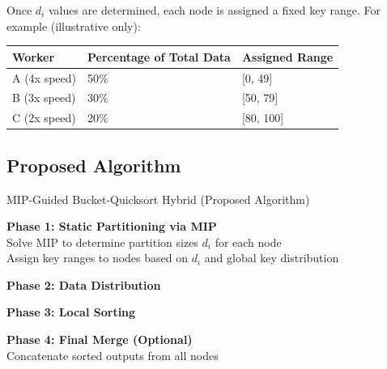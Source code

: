\documentclass[]{interact}
\theoremstyle{plain}
\theoremstyle{definition}
\theoremstyle{remark}
\begin{document}
Once $d_i$ values are determined, each node is assigned a fixed key range. For example (illustrative only):

\begin{center}
\begin{tabular}{|p{4cm}|p{5cm}|p{4cm}|}
\hline
\textbf{Worker} & \textbf{Percentage of Total Data} & \textbf{Assigned Range} \\
\hline
A (4x speed) & 50\% & [0, 49] \\
\hline
B (3x speed) & 30\% & [50, 79] \\
\hline
C (2x speed) & 20\% & [80, 100] \\
\hline
\end{tabular}
\end{center}

\subsection{Proposed Algorithm}

\begin{algorithm}[H]
\caption{MIP-Guided Bucket-Quicksort Hybrid (Proposed Algorithm)}



\textbf{Phase 1: Static Partitioning via MIP} \\
Solve MIP to determine partition sizes $d_i$ for each node \\
Assign key ranges to nodes based on $d_i$ and global key distribution

\textbf{Phase 2: Data Distribution} \\

\textbf{Phase 3: Local Sorting} \\

\textbf{Phase 4: Final Merge (Optional)} \\
Concatenate sorted outputs from all nodes

\end{algorithm}
\end{document}
